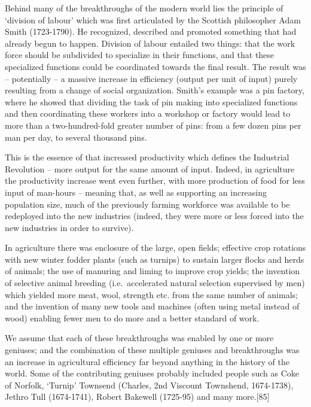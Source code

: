 \documentclass[
]{book}
\begin{document}
Behind many of the breakthroughs of the modern world lies the principle of `division of labour' which was first articulated by the Scottish philosopher Adam Smith (1723-1790). He recognized, described and promoted something that had already begun to happen. Division of labour entailed two things: that the work force should be subdivided to specialize in their functions, and that these specialized functions could be coordinated towards the final result. The result was -- potentially -- a massive increase in efficiency (output per unit of input) purely resulting from a change of social organization. Smith's example was a pin factory, where he showed that dividing the task of pin making into specialized functions and then coordinating these workers into a workshop or factory would lead to more than a two-hundred-fold greater number of pins: from a few dozen pins per man per day, to several thousand pins.

This is the essence of that increased productivity which defines the Industrial Revolution -- more output for the same amount of input. Indeed, in agriculture the productivity increase went even further, with more production of food for less input of man-hours -- meaning that, as well as supporting an increasing population size, much of the previously farming workforce was available to be redeployed into the new industries (indeed, they were more or less forced into the new industries in order to survive).

In agriculture there was enclosure of the large, open fields; effective crop rotations with new winter fodder plants (such as turnips) to sustain larger flocks and herds of animals; the use of manuring and liming to improve crop yields; the invention of selective animal breeding (i.e.~accelerated natural selection supervised by men) which yielded more meat, wool, strength etc. from the same number of animals; and the invention of many new tools and machines (often using metal instead of wood) enabling fewer men to do more and a better standard of work.

We assume that each of these breakthroughs was enabled by one or more geniuses; and the combination of these multiple geniuses and breakthroughs was an increase in agricultural efficiency far beyond anything in the history of the world. Some of the contributing geniuses probably included people such as Coke of Norfolk, `Turnip' Townsend (Charles, 2nd Viscount Townshend, 1674-1738), Jethro Tull (1674-1741), Robert Bakewell (1725-95) and many more.{[}85{]}
\end{document}
